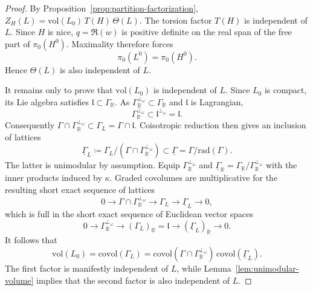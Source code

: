 \documentclass[10pt,a4paper]{amsart}
\numberwithin{table}{section}
\numberwithin{equation}{section}
\newcommand{\fl}{\mathfrak{l}}
\newcommand{\R}{\mathbb{R}}
\newcommand{\rad}{\mathrm{rad}}
\newcommand{\vol}{\mathrm{vol}}
\newcommand{\covol}{\mathrm{covol}}
\begin{document}
\begin{proof}
By Proposition~\ref{prop:partition-factorization}, $Z_H(L)=\vol(L_0)\, T(H)\, \Theta(L)$. The torsion factor $T(H)$ is independent of $L$. Since $H$ is nice, $q=\Re(w)$ is positive definite on the real span of the free part of $\pi_0(H^0)$. Maximality therefore forces
\[
\pi_0(L^0)=\pi_0(H^0).
\]
Hence $\Theta(L)$ is also independent of $L$. 

It remains only to prove that $\vol(L_0)$ is independent of $L$. 
Since $L_0$ is compact, its Lie algebra satisfies $\fl\subset\Gamma_\R$. As $\Gamma_\R^{\perp_\omega} \subset \Gamma_\R$ and $\fl$ is Lagrangian,
\[
\Gamma_\R^{\perp_\omega} \subset \fl^{\perp_\omega}=\fl.
\]
Consequently $\Gamma\cap \Gamma_\R^{\perp_\omega} \subset\Gamma_L=\Gamma\cap\fl$. Coisotropic reduction then gives an inclusion of lattices
\[
\underline\Gamma_L \coloneq \Gamma_L/(\Gamma\cap \Gamma_\R^{\perp_\omega} )
\subset
\underline\Gamma = \Gamma/\rad(\Gamma).
\]
The latter is unimodular by assumption. Equip $\Gamma_\R^{\perp_\omega}$ and $\underline{\Gamma}_\R = \Gamma_\R/\Gamma_\R^{\perp_\omega}$ with the inner products induced by $\kappa$. Graded covolumes are multiplicative for the resulting short exact sequence of lattices
\[
0 \longrightarrow \Gamma\cap \Gamma_\R^{\perp_\omega} \longrightarrow \Gamma_L \longrightarrow \underline\Gamma_L \longrightarrow 0,
\]
which is full in the short exact sequence of Euclidean vector spaces
\[
0 \longrightarrow \Gamma_\R^{\perp_\omega} \longrightarrow (\Gamma_L)_\R = \fl \longrightarrow (\underline \Gamma_L)_\R \longrightarrow 0.
\]
It follows that
\[
\vol(L_0)
=
\covol(\Gamma_L)
=
\covol(\Gamma \cap \Gamma_\R^{\perp_\omega})\,
\covol(\underline\Gamma_L).
\]
The first factor is manifestly independent of $L$, while Lemma~\ref{lem:unimodular-volume} implies that the second factor is also independent of $L$.
\end{proof}
\end{document}
